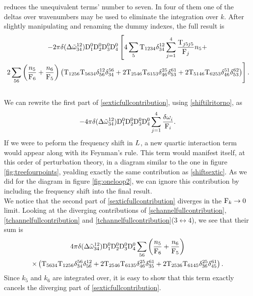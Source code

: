 reduces the unequivalent terms' number to seven. In four of them one of the deltas over wavenumbers may be used to eliminate the integration over $k$. After slightly manipulating
and renaming the dummy indexes, the full result is 
\begin{multline}
    -2\pi \delta(\Delta{\tilde{\omega}}^{12}_{34})\mathrm{D}_1^0\mathrm{D}_2^0\mathrm{D}_3^0\mathrm{D}_4^0\left[ 4\sum_5\mathrm{T}_{1234}\delta^{12}_{34} \sum_{j=1}^{4}\frac{\mathrm{T}_{j5j5}}{\mathrm{F}_j}n_5 + \right.\\ 
    \left.  2\sum_{56}\left( \frac{n_5}{\mathrm{F}_6} + \frac{n_6}{\mathrm{F}_5} \right)\left( \mathrm{T}_{1256}\mathrm{T}_{5634}\delta^{12}_{56}\delta^{56}_{34} 
    + 2\mathrm{T}_{2546}\mathrm{T}_{6153}\delta^{25}_{46}\delta^{61}_{53}
    + 2\mathrm{T}_{5146}\mathrm{T}_{6253}\delta^{51}_{46}\delta^{62}_{53} \right) \right].
    \label{sexticfullcontribution}
\end{multline}
\\
We can rewrite the first part of \eqref{sexticfullcontribution}, using \eqref{shiftilritorno}, as 
\begin{equation}
    -4\pi \delta(\Delta{\tilde{\omega}}^{12}_{34})\mathrm{D}_1^0\mathrm{D}_2^0\mathrm{D}_3^0\mathrm{D}_4^0\sum_{j=1}^{4}\frac{\delta \omega^{}_i}{\mathrm{F}_i}.
    \label{shiftsextic}
\end{equation}
If we were to peform the frequency shift in $L$, a new quartic interaction term would appear along with its Feynman's rule. 
This term would manifest itself, at this order of perturbation theory, in a diagram similar to the one in figure \ref{fig:treefourpoints}, 
yealding exactly the same contribution as \eqref{shiftsextic}. As we did for the diagram in figure \ref{fig:oneloop2}, we can ignore this contribution by including
the frequency shift into the final result. \\
We notice that the second part of \eqref{sexticfullcontribution} diverges in the $\mathrm{F}_k \rightarrow 0$ limit. Looking at the diverging contributions of 
\eqref{schannelfullcontribution}, \eqref{tchannelfullcontribution} and \eqref{tchannelfullcontribution}($3 \leftrightarrow 4$), we see that their sum is
\begin{multline}
    4\pi\delta(\Delta{\tilde{\omega}}^{12}_{34})\mathrm{D}_1^0\mathrm{D}_2^0\mathrm{D}_3^0\mathrm{D}_4^0\sum_{56}
     \left( \frac{n_5}{\mathrm{F}_6} + \frac{n_6}{\mathrm{F}_5}\right)\\ \times\left(
    \mathrm{T}_{5634}\mathrm{T}_{1256}\delta^{56}_{34}\delta^{12}_{56} + 2 \mathrm{T}_{2546}\mathrm{T}_{6135}\delta^{25}_{46}\delta^{61}_{35} + 2\mathrm{T}_{2536}\mathrm{T}_{6145}\delta^{25}_{36}\delta^{61}_{45}
    \right).
\end{multline}
Since $k_5$ and $k_6$ are integrated over, it is easy to show that this term exactly cancels the diverging part of \eqref{sexticfullcontribution}.\\
